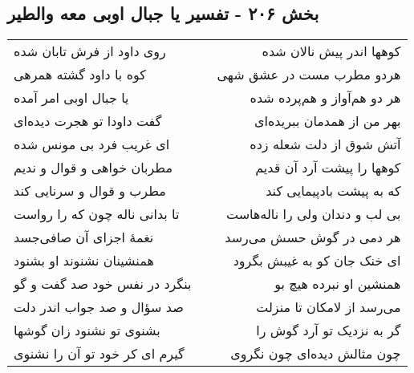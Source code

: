 \begin{center}
\section*{بخش ۲۰۶ - تفسیر یا جبال اوبی معه والطیر}
\label{sec:sh206}
\begin{longtable}{l p{0.5cm} r}
روی داود از فرش تابان شده
&&
کوهها اندر پیش نالان شده
\\
کوه با داود گشته همرهی
&&
هردو مطرب مست در عشق شهی
\\
یا جبال اوبی امر آمده
&&
هر دو هم‌آواز و هم‌پرده شده
\\
گفت داودا تو هجرت دیده‌ای
&&
بهر من از همدمان ببریده‌ای
\\
ای غریب فرد بی مونس شده
&&
آتش شوق از دلت شعله زده
\\
مطربان خواهی و قوال و ندیم
&&
کوهها را پیشت آرد آن قدیم
\\
مطرب و قوال و سرنایی کند
&&
که به پیشت بادپیمایی کند
\\
تا بدانی ناله چون که را رواست
&&
بی لب و دندان ولی را ناله‌هاست
\\
نغمهٔ اجزای آن صافی‌جسد
&&
هر دمی در گوش حسش می‌رسد
\\
همنشینان نشنوند او بشنود
&&
ای خنک جان کو به غیبش بگرود
\\
بنگرد در نفس خود صد گفت و گو
&&
همنشین او نبرده هیچ بو
\\
صد سؤال و صد جواب اندر دلت
&&
می‌رسد از لامکان تا منزلت
\\
بشنوی تو نشنود زان گوشها
&&
گر به نزدیک تو آرد گوش را
\\
گیرم ای کر خود تو آن را نشنوی
&&
چون مثالش دیده‌ای چون نگروی
\\
\end{longtable}
\end{center}
